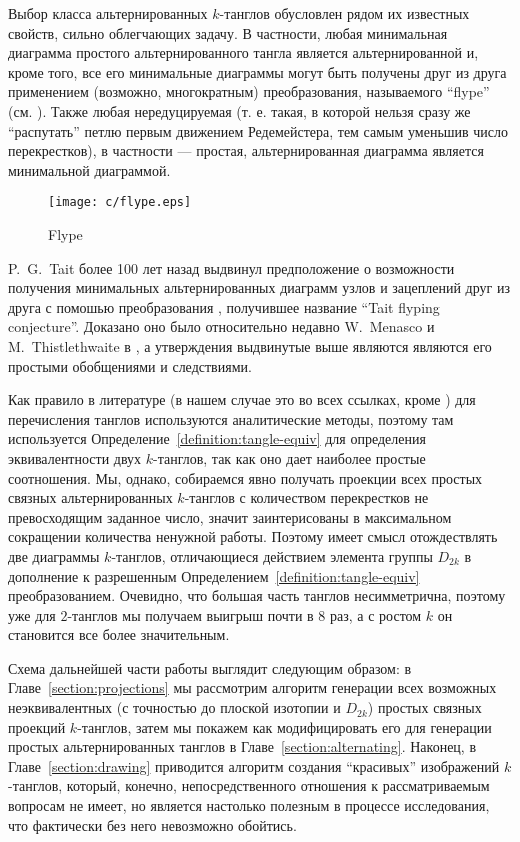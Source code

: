 	Выбор класса альтернированных $k$-танглов обусловлен рядом их известных свойств, сильно облегчающих задачу. В частности,
	любая минимальная диаграмма простого альтернированного тангла является альтернированной и, кроме того, все его минимальные диаграммы
	могут быть получены друг из друга применением (возможно, многократным) преобразования, называемого ``flype''
	(см. ). Также любая нередуцируемая (т. е. такая, в которой нельзя сразу же ``распутать'' петлю
	первым движением Редемейстера, тем самым уменьшив число перекрестков), в частности --- простая, альтернированная диаграмма
	является минимальной диаграммой.

	\begin{figure}[ht]
		\centering
		\texttt{[image: c/flype.eps]}
		\caption{Flype\label{figure:flype}}
	\end{figure}

	P.~G.~Tait более 100 лет назад \cite{Tait1900} выдвинул предположение о возможности получения минимальных альтернированных диаграмм
	узлов и зацеплений друг из друга с помошью преобразования , получившее название ``Tait flyping conjecture''.
	Доказано оно было относительно недавно W.~Menasco и M.~Thistlethwaite в \cite{MenascoThistlethwaite1991, MenascoThistlethwaite1993},
	а утверждения выдвинутые выше являются являются его простыми обобщениями и следствиями.

	Как правило в литературе (в нашем случае это во всех ссылках, кроме \cite{KanenobuSaitoSatoh2003}) для перечисления танглов
	используются аналитические методы, поэтому там используется Определение~\ref{definition:tangle-equiv} для определения эквивалентности
	двух $k$-танглов, так как оно дает наиболее простые соотношения. Мы, однако, собираемся явно получать проекции всех простых связных
	альтернированных $k$-танглов с количеством перекрестков не превосходящим заданное число, значит заинтерисованы в максимальном сокращении
	количества ненужной работы. Поэтому имеет смысл отождествлять две диаграммы $k$-танглов, отличающиеся действием элемента
	группы $D_{2k}$ в дополнение к разрешенным Определением~\ref{definition:tangle-equiv} преобразованием. Очевидно, что большая часть
	танглов несимметрична, поэтому уже для $2$-танглов мы получаем выигрыш почти в 8 раз, а с ростом $k$ он становится все более
	значительным.

	Схема дальнейшей части работы выглядит следующим образом: в Главе~\ref{section:projections} мы рассмотрим алгоритм генерации
	всех возможных неэквивалентных (с точностью до плоской изотопии и $D_{2k}$) простых связных проекций $k$-танглов, затем мы
	покажем как модифицировать его для генерации простых альтернированных танглов в Главе~\ref{section:alternating}. Наконец,
	в Главе~\ref{section:drawing} приводится алгоритм создания ``красивых'' изображений $k$-танглов, который, конечно,
	непосредственного отношения к рассматриваемым вопросам не имеет, но является настолько полезным в процессе исследования, что
	фактически без него невозможно обойтись.
